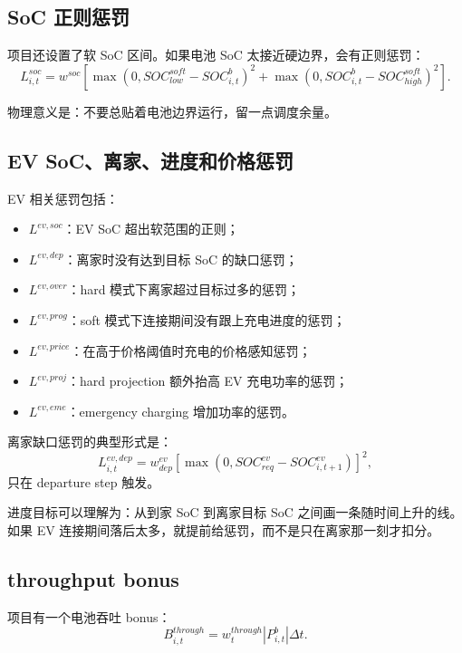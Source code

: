 \documentclass[UTF8,zihao=-4]{ctexart}
\begin{document}
\subsection{SoC 正则惩罚}

项目还设置了软 SoC 区间。如果电池 SoC 太接近硬边界，会有正则惩罚：
\begin{equation}
L^{soc}_{i,t}
=
w^{soc}
\left[
\max(0,SOC^{soft}_{low}-SOC^b_{i,t})^2
+
\max(0,SOC^b_{i,t}-SOC^{soft}_{high})^2
\right].
\end{equation}

物理意义是：不要总贴着电池边界运行，留一点调度余量。

\subsection{EV SoC、离家、进度和价格惩罚}

EV 相关惩罚包括：
\begin{itemize}
  \item $L^{ev,soc}$：EV SoC 超出软范围的正则；
  \item $L^{ev,dep}$：离家时没有达到目标 SoC 的缺口惩罚；
  \item $L^{ev,over}$：hard 模式下离家超过目标过多的惩罚；
  \item $L^{ev,prog}$：soft 模式下连接期间没有跟上充电进度的惩罚；
  \item $L^{ev,price}$：在高于价格阈值时充电的价格感知惩罚；
  \item $L^{ev,proj}$：hard projection 额外抬高 EV 充电功率的惩罚；
  \item $L^{ev,eme}$：emergency charging 增加功率的惩罚。
\end{itemize}

离家缺口惩罚的典型形式是：
\begin{equation}
L^{ev,dep}_{i,t}
=
w^{ev}_{dep}
\left[
\max(0,SOC^{ev}_{req}-SOC^{ev}_{i,t+1})
\right]^2,
\end{equation}
只在 departure step 触发。

进度目标可以理解为：从到家 SoC 到离家目标 SoC 之间画一条随时间上升的线。如果 EV 连接期间落后太多，就提前给惩罚，而不是只在离家那一刻才扣分。

\subsection{throughput bonus}

项目有一个电池吞吐 bonus：
\begin{equation}
B^{through}_{i,t}
=
w^{through}_t
|P^b_{i,t}|
\Delta t.
\end{equation}
\end{document}
